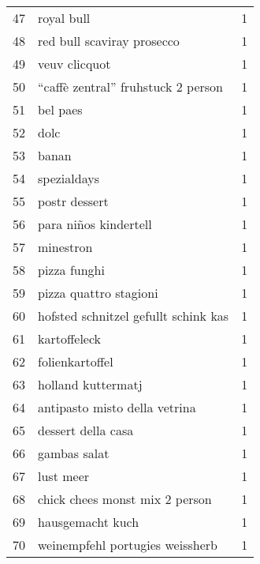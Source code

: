 \begin{tabular}{llr}
47  &                                         royal bull &      1 \\
48  &                         red bull scaviray prosecco &      1 \\
49  &                                      veuv clicquot &      1 \\
50  &                 “caffè zentral” fruhstuck 2 person &      1 \\
51  &                                           bel paes &      1 \\
52  &                                               dolc &      1 \\
53  &                                              banan &      1 \\
54  &                                        spezialdays &      1 \\
55  &                                      postr dessert &      1 \\
56  &                              para niños kindertell &      1 \\
57  &                                          minestron &      1 \\
58  &                                       pizza funghi &      1 \\
59  &                             pizza quattro stagioni &      1 \\
60  &               hofsted schnitzel gefullt schink kas &      1 \\
61  &                                       kartoffeleck &      1 \\
62  &                                    folienkartoffel &      1 \\
63  &                                 holland kuttermatj &      1 \\
64  &                      antipasto misto della vetrina &      1 \\
65  &                                 dessert della casa &      1 \\
66  &                                       gambas salat &      1 \\
67  &                                          lust meer &      1 \\
68  &                     chick chees monst mix 2 person &      1 \\
69  &                                   hausgemacht kuch &      1 \\
70  &                    weinempfehl portugies weissherb &      1 \\

\end{tabular}
